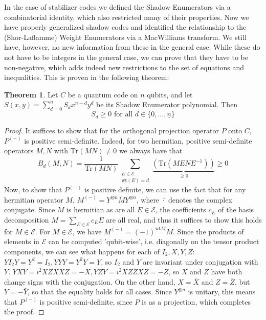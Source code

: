 \documentclass[12pt,a4paper,BCOR15mm,twoside,DIV12]{article}
\def\E{\mathcal{E}}
\def\n{\underline{n}}
\def\fa{\text{ for all }}
\def\Tr{\text{Tr}}
\def\wt{\text{wt}}
\theoremstyle{definition}
\newtheorem{theorem}[Satz]{Theorem}
\begin{document}
In the case of stabilizer codes we defined the Shadow Enumerators via a combinatorial identity, which also restricted many of their properties.
Now we have properly generalized shadow codes and identified the relationship to the (Shor-Laflamme) Weight Enumerators via a MacWilliams transform. We still have, however, no new information from these in the general case. 
While these do not have to be integers in the general case, we can prove that they have to be non-negative, which adds indeed new restrictions to the set of equations and inequalities. This is proven in the following theorem:

\begin{theorem}\label{shadowgeq0}
Let $C$ be a quantum code on $n$ qubits, and let $S(x,y)= \sum_{d=0}^n S_d x^{n-d} y^d $ be its Shadow Enumerator polynomial. Then \begin{equation} S_d \geq 0 \fa d \in \{0, \ldots, \n \} \end{equation}
\begin{proof}
It suffices to show that for the orthogonal projection operator $P$ onto $C$, $P^{(-)}$ is positive semi-definite. Indeed, for two hermitian, positive semi-definite operators $M,N$ with $\Tr(MN) \neq 0$ we always have that
\begin{equation} B_d(M,N) = \frac{1}{\Tr(M N)} \sum_{\substack{E \in \mathcal{E} \\ \wt(E) = d}} \underbrace{(\Tr(M E N E^{-1}))}_{\geq 0}  \geq 0 \end{equation}
Now, to show that $P^{(-)}$ is positive definite, we can use the fact that for any hermitian operator $M$,  $M^{(-)} = Y^{\otimes n} \bar M Y^{\otimes n}$, where $\bar \cdot$ denotes the complex conjugate.
Since $M$ is hermitian as are all $E \in \E$, the coefficients $c_E$ of the basis decomposition $M = \sum_{E \in \E} c_E E$ are all real, and thus it suffices to show this holds for $M \in \E$.
For $M \in \E$, we have $ M^{(-)} = (-1)^{\wt M} M$. Since the products of elements in $\E$ can be computed 'qubit-wise', i.e. diagonally on the tensor product components, we can see what happens for each of $I_2, X, Y, Z$:
$YI_2Y = Y^2 = I_2, YYY = Y^2 Y = Y$, so $I_2$ and $Y$ are invariant under conjugation with $Y$. $YXY = i^2 XZXXZ = -X, YZY = i^2 XZZXZ = -Z$, so $X$ and $Z$ have both change signs with the conjugation. 
On the other hand, $X = \bar X$ and $Z = \bar Z$, but $Y = - \bar Y$, so that the equality holds for all cases. Since $Y^{\otimes n}$ is unitary, this means that $P^{(-)}$ is positive semi-definite, since $P$ is as a projection, which completes the proof.
\end{proof}
\end{theorem}
\end{document}
